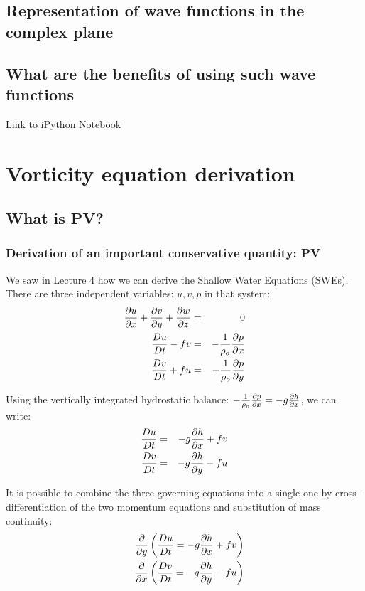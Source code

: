 \section{Representation of wave functions in the complex plane}

\section{What are the benefits of using such wave functions}
Link to iPython Notebook

\vspace{1em} 


\chapter{Vorticity equation derivation}

\section{What is PV?}

\subsection{Derivation of an important conservative quantity: PV}

We saw in Lecture 4 how we can derive the Shallow Water Equations (SWEs). There are three independent variables: $u,v,p$ in that system:
\begin{eqnarray}
	\frac{\partial u}{\partial x}+\frac{\partial v}{\partial y}+\frac{\partial w}{\partial z} & = & 0 \\
	\frac{D u}{D t}-fv & = & -\frac{1}{\rho_o}\frac{\partial p}{\partial x} \\
	\frac{D v}{D t}+fu & = & -\frac{1}{\rho_o}\frac{\partial p}{\partial y}
\end{eqnarray}

Using the vertically integrated hydrostatic balance: $-\frac{1}{\rho_o} \frac{\partial p}{\partial x} = -g \frac{\partial h}{\partial x}$, we can write: 
\begin{eqnarray}
	\frac{D u}{D t} & = & -g\frac{\partial h}{\partial x} +fv\\
	\frac{D v}{D t} & = & -g\frac{\partial h}{\partial y} -fu
\end{eqnarray}

It is possible to combine the three governing equations into a single one by cross-differentiation of the two momentum equations and substitution of mass continuity:
\begin{eqnarray}
	&&\frac{\partial}{\partial y} \left( \frac{D u}{D t} = -g\frac{\partial h}{\partial x} +fv \right) \\
	&&\frac{\partial}{\partial x} \left( \frac{D v}{D t} = -g\frac{\partial h}{\partial y} -fu \right) 
\end{eqnarray}

